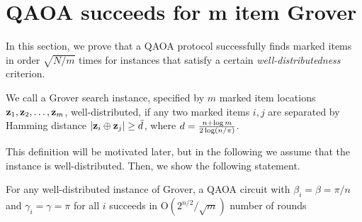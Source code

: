 \documentclass[11pt]{article}
\begin{document}
\section{QAOA succeeds for m item Grover}
\label{sec:proof}

In this section, we prove that a QAOA protocol successfully finds marked items in order $\sqrt{N/m}$ times for instances that satisfy a certain \emph{well-distributedness} criterion.
\begin{definition}
 We call a Grover search instance, specified by $m$ marked item locations $\mathbf{z}_1, \mathbf{z}_2,\ldots, \mathbf{z}_m$, well-distributed, if any two marked items $i,j$ are separated by Hamming distance $|\mathbf{z}_i\oplus \mathbf{z}_j| \ge \bar d$, where $d = \frac{n + \log m}{2\log\left(n/\pi\right)}$. 
\end{definition}

This definition will be motivated later, but in the following we assume that the instance is well-distributed. Then, we show the following statement.
\begin{theorem}
For any well-distributed instance of Grover, a QAOA circuit with $\beta_i = \beta = \pi/n$ and $\gamma_i=\gamma=\pi$ for all $i$ succeeds in O$(2^{n/2}/\sqrt{m})$ number of rounds   
\end{theorem}
\end{document}
